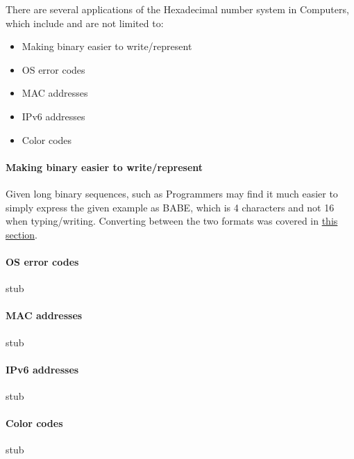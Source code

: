 \documentclass[../main.tex]{subfiles}
\begin{document}
There are several applications of the Hexadecimal number system in Computers, which include and are not limited to:

\begin{itemize}

\item Making binary easier to write/represent

\item OS error codes

\item MAC addresses

\item IPv6 addresses

\item Color codes

\end{itemize}

\paragraph{Making binary easier to write/represent}

Given long binary sequences, such as {}Programmers may find it much easier to simply express the given example as {\mono BABE}, which is 4 characters and not 16 when typing/writing. Converting between the two formats was covered in \hyperref[sec:1-converting-between-bin-den-and-hexadecimal]{this section}.

\paragraph{OS error codes}
stub

\paragraph{MAC addresses}
stub

\paragraph{IPv6 addresses}
stub

\paragraph{Color codes}
stub
\end{document}
